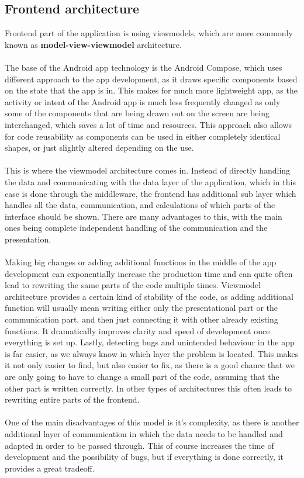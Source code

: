 \subsection{Frontend architecture}
\hspace{\parindent}Frontend part of the application is using viewmodels, which are more commonly known as \textbf{model-view-viewmodel} architecture.\\ \\
The base of the Android app technology is the Android Compose, which uses different approach to the app development, as it draws specific components based on the state that the app is in. This makes for much more lightweight app, as the activity or intent of the Android app is much less frequently changed as only some of the components that are being drawn out on the screen are being interchanged, which saves a lot of time and resources. This approach also allows for code reusability as components can be used in either completely identical shapes, or just slightly altered depending on the use.\\ \\
This is where the viewmodel architecture comes in. Instead of directly handling the data and communicating with the data layer of the application, which in this case is done through the middleware, the frontend has additional sub layer which handles all the data, communication, and calculations of which parts of the interface should be shown. There are many advantages to this, with the main ones being complete independent handling of the communication and the presentation.\\ \\
Making big changes or adding additional functions in the middle of the app development can exponentially increase the production time and can quite often lead to rewriting the same parts of the code multiple times. Viewmodel architecture provides a certain kind of stability of the code, as adding additional function will usually mean writing either only the presentational part or the communication part, and then just connecting it with other already existing functions. It dramatically improves clarity and speed of development once everything is set up. Lastly, detecting bugs and unintended behaviour in the app is far easier, as we always know in which layer the problem is located. This makes it not only easier to find, but also easier to fix, as there is a good chance that we are only going to have to change a small part of the code, assuming that the other part is written correctly. In other types of architectures this often leads to rewriting entire parts of the frontend.\\ \\
One of the main disadvantages of this model is it's complexity, as there is another additional layer of communication in which the data needs to be handled and adapted in order to be passed through. This of course increases the time of development and the possibility of bugs, but if everything is done correctly, it provides a great tradeoff.\\

